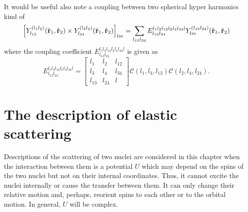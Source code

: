 \documentclass[
12pt, %
oneside, %
english, %
onehalfspacing, %
headsepline, %
]{MastersDoctoralThesis} %
\begin{document}
It would be useful also note a coupling between two spherical hyper harmonics kind of
\begin{equation}
\left[ Y^{(l_1l_2)}_{l_{12}}(\hat{{\bf r}}_1,\hat{{\bf r}}_2) \times Y^{(l_3l_4)}_{l_{34}}(\hat{{\bf r}}_1,\hat{{ \bf r}}_2) \right]_{lm}= \sum_{l_{13}l_{24}} {E}^{l_1l_2l_{12}l_2l_4l_{34}l}_{l_{13}l_{24}}  Y^{(l_{13}l_{24})}_{lm}(\hat{{\bf r}}_1,\hat{{\bf r}}_2)
\label{hyperSphTrans}
\end{equation}
where the coupling coefficient ${E}^{l_1l_2l_{12}l_2l_4l_{34}l}_{l_{13}l_{24}}$ is given as
\begin{equation}
{E}^{l_1l_2l_{12}l_2l_4l_{34}l}_{l_{13}l_{24}} = 
\begin{bmatrix}
l_1 & l_2 & l_{12} \\ 
l_3 & l_4 & l_{34} \\ 
l_{13} & l_{24} & l
\end{bmatrix}
\mathcal{C}(l_1,l_3,l_{13})\mathcal{C}(l_2,l_4,l_{24}).
\end{equation}

  

\section{The description of elastic scattering}
Descriptions of the scattering of two nuclei are considered in this chapter when the interaction between them is a potential $U$ which may depend on the spins of the two nuclei but not on their internal coordinates. Thus, it cannot excite the nuclei internally or cause the transfer between them. It can only change their relative motion and, perhaps, reorient spins to each other or to the orbital motion. In general, $U$ will be complex. 
\end{document}
